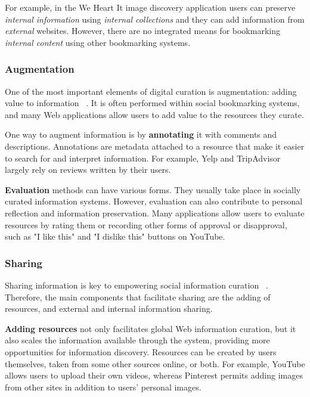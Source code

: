 {{{For example, in the We Heart It image discovery application users can preserve \textit{internal  information} using \textit{internal collections} and they can add information from \textit{external} websites. However, there are no integrated means for bookmarking \textit{internal content} using other bookmarking systems.  
} %

{\subsubsection{Augmentation}
One of the most important elements of digital curation is augmentation: adding value to information ~\cite{beagrie2008digital,whittaker2011personal}. It is often performed within social bookmarking systems, and many Web applications allow users to add value to the resources they curate. 

One way to augment information is by \textbf{annotating} it with comments and descriptions. Annotations are metadata attached to a resource that make it easier to search for and interpret information. For example, Yelp and TripAdvisor largely rely on reviews written by their users. 

\textbf{Evaluation} methods can have various forms. They usually take place in socially curated information systems. However, evaluation can also contribute to personal reflection and information preservation. Many applications allow users to evaluate resources by rating them or recording other forms of approval or disapproval, such as "I like this" and "I dislike this" buttons on YouTube.
} %

{\subsubsection{Sharing}
Sharing information is key to empowering social information curation ~\cite{beagrie2008digital}. Therefore, the main components that facilitate sharing are the adding of resources, and external and internal information sharing.

\textbf{Adding resources} not only facilitates global Web information curation, but it also scales the information available through the system, providing more opportunities for information discovery. Resources can be created by users themselves, taken from some other sources online, or both. For example, YouTube allows users to upload their own videos, whereas Pinterest permits adding images from other sites in addition to users' personal images. 

}}}
